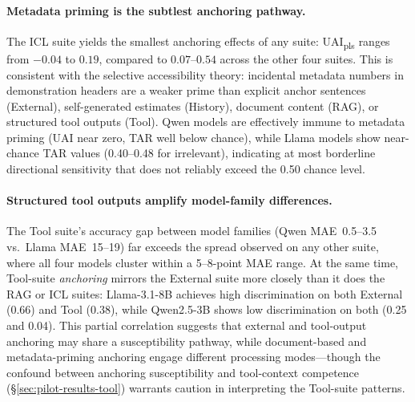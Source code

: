 \paragraph{Metadata priming is the subtlest anchoring
  pathway.}
The ICL suite yields the smallest anchoring effects of any
suite: UAI\textsubscript{pls} ranges from $-0.04$ to $0.19$,
compared to $0.07$--$0.54$ across the other four suites.
This is consistent with the selective accessibility theory:
incidental metadata numbers in demonstration headers are a
weaker prime than explicit anchor sentences (External),
self-generated estimates (History), document content (RAG),
or structured tool outputs (Tool).
Qwen models are effectively immune to metadata priming
(UAI near zero, TAR well below chance), while Llama models
show near-chance TAR values (0.40--0.48 for irrelevant),
indicating at most borderline directional sensitivity that
does not reliably exceed the 0.50 chance level.

\paragraph{Structured tool outputs amplify model-family
  differences.}
The Tool suite's accuracy gap between model families
(Qwen MAE~0.5--3.5 vs.\ Llama MAE~15--19) far exceeds the
spread observed on any other suite, where all four models
cluster within a 5--8-point MAE range.
At the same time, Tool-suite \emph{anchoring} mirrors the
External suite more closely than it does the RAG or ICL
suites:
Llama-3.1-8B achieves high discrimination on both External
(0.66) and Tool (0.38), while Qwen2.5-3B shows low
discrimination on both (0.25 and 0.04).
This partial correlation suggests that external and
tool-output anchoring may share a susceptibility pathway,
while document-based and metadata-priming anchoring engage
different processing modes---though the confound between
anchoring susceptibility and tool-context competence
(\S\ref{sec:pilot-results-tool}) warrants caution in
interpreting the Tool-suite patterns.
